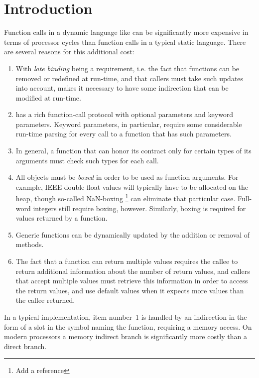 \section{Introduction}
\label{sec-introduction}

Function calls in a dynamic language like \commonlisp{} can be
significantly more expensive in terms of processor cycles than
function calls in a typical static language.  There are several
reasons for this additional cost:

\begin{enumerate}
\item With \emph{late binding} being a requirement, i.e. the fact that
  functions can be removed or redefined at run-time, and that callers
  must take such updates into account, makes it necessary to have some
  indirection that can be modified at run-time.
\item \commonlisp{} has a rich function-call protocol with optional
  parameters and keyword parameters.  Keyword parameters, in
  particular, require some considerable run-time parsing for every
  call to a function that has such parameters.
\item In general, a function that can honor its contract only for
  certain types of its arguments must check such types for each call.
\item All objects must be \emph{boxed} in order to be used as function
  arguments.  For example, IEEE double-float values will typically
  have to be allocated on the heap, though so-called NaN-boxing%
  \footnote{Add a reference} can eliminate that particular case.
  Full-word integers still require boxing, however.  Similarly, boxing
  is required for values returned by a function.
\item Generic functions can be dynamically updated by the addition or
  removal of methods.
\item The fact that a function can return multiple values requires the
  callee to return additional information about the number of
  return values, and callers that accept multiple values must retrieve
  this information in order to access the return values, and use
  default values when it expects more values than the callee
  returned.
\end{enumerate}

In a typical \commonlisp{} implementation, item number~1 is handled by
an indirection in the form of a slot in the symbol naming the
function, requiring a memory access.  On modern processors a memory
indirect branch is significantly more costly than a direct branch.

